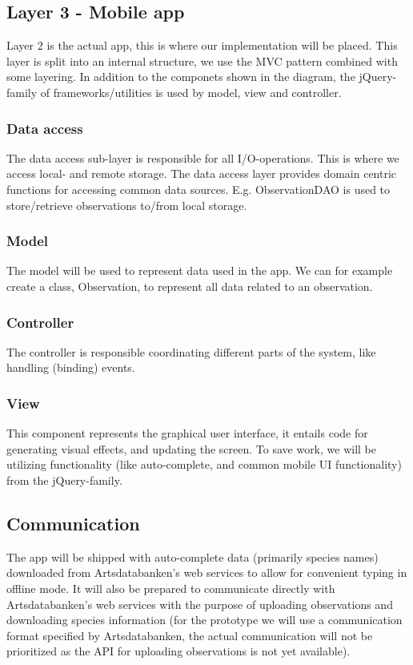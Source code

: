 \subsection{Layer 3 - Mobile app}

Layer 2 is the actual app, this is where our implementation will be placed.
This layer is split into an internal structure, we use the MVC pattern combined
with some layering. In addition to the componets shown in the diagram, the
jQuery-family of frameworks/utilities is used by model, view and controller.

	\subsubsection{Data access}
	
	The data access sub-layer is responsible for all I/O-operations. This is
	where we access local- and remote storage. The data access layer provides
	domain centric functions for accessing common data sources. E.g.
	ObservationDAO is used to store/retrieve observations to/from local storage.

	\subsubsection{Model}

	The model will be used to represent data used in the app. We can for example
	create a class, Observation, to represent all data related to an
	observation.

	\subsubsection{Controller}

	The controller is responsible coordinating different parts of the system,
	like handling (binding) events.

	\subsubsection{View}

	This component represents the graphical user interface, it entails code for
	generating visual effects, and updating the screen. To save work, we will be
	utilizing functionality (like auto-complete, and common mobile UI
	functionality) from the jQuery-family.

\subsection{Communication}

The app will be shipped with auto-complete data (primarily species names)
downloaded from Artsdatabanken's web services to allow for convenient typing in
offline mode. It will also be prepared to communicate directly with
Artsdatabanken's web services with the purpose of uploading observations and
downloading species information (for the prototype we will use a communication
format specified by Artsdatabanken, the actual communication will not be
prioritized as the API for uploading observations is not yet available).
